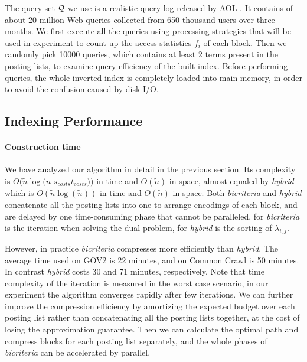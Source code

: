 \documentclass{sig-alternate-05-2015}
\begin{document}
The query set $ \cal Q $ we use is a realistic query log released by AOL \cite{pass2006picture}.
It contains of about 20 million Web queries collected from 650 thousand users over three months.
We first execute all the queries using processing strategies that will be used in experiment to count up the access statistics $ f_i $ of each block.
Then we randomly pick 10000 queries, which contains at least 2 terms present in the posting lists, to examine query efficiency of the built index.
Before performing queries, the whole inverted index is completely loaded into main memory, in order to avoid the confusion caused by disk I/O.

\subsection{Indexing Performance}
\paragraph*{Construction time}
We have analyzed our algorithm in detail in the previous section.
Its complexity is $ O(\tilde{n} \log(n $ $ s_{costs} t_{costs})) $ in time and $ O(\tilde{n}) $ in space, almost equaled by \textit{hybrid} which is $ O(\tilde{n}\log(\tilde{n})) $ in time and $ O(\tilde{n}) $ in space.
Both \textit{bicriteria} and \textit{hybrid} concatenate all the posting lists into one to arrange encodings of each block, and are delayed by one time-consuming phase that cannot be paralleled, for \textit{bicriteria} is the iteration when solving the dual problem, for \textit{hybrid} is the sorting of $ \lambda_{i,j} $.

However, in practice \textit{bicriteria} compresses more efficiently than \textit{hybrid}.
The average time used on GOV2 is 22 minutes, and on Common Crawl is 50 minutes.
In contrast \textit{hybrid} costs 30 and 71 minutes, respectively.
Note that time complexity of the iteration is measured in the worst case scenario, in our experiment the algorithm converges rapidly after few iterations.
We can further improve the compression efficiency by amortizing the expected budget over each posting list rather than concatenating all the posting lists together, at the cost of losing the approximation guarantee.
Then we can calculate the optimal path and compress blocks for each posting list separately, and the whole phases of \textit{bicriteria} can be accelerated by parallel.
\end{document}
